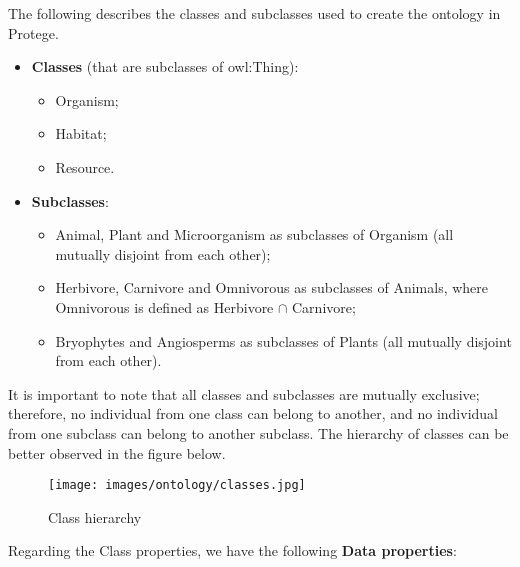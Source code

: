 

The following describes the classes and subclasses used to create the ontology in Protege.
\\

\begin{itemize}
    \item \textbf{Classes} (that are subclasses of owl:Thing):
    \begin{itemize}
        \item Organism;

        \item Habitat;

        \item Resource.
        \\
    \end{itemize}

    \item \textbf{Subclasses}:
    \begin{itemize}
        \item Animal, Plant and Microorganism as subclasses of Organism (all mutually disjoint from each other);

        \item Herbivore, Carnivore and Omnivorous as subclasses of Animals, where Omnivorous is defined as Herbivore $\cap$ Carnivore;

        \item Bryophytes and  Angiosperms as subclasses of Plants (all mutually disjoint from each other).
        \\
    \end{itemize} 
\end{itemize}

It is important to note that all classes and subclasses are mutually exclusive; therefore, no individual from one class can belong to another, and no individual from one subclass can belong to another subclass. The hierarchy of classes can be better observed in the figure below.

\begin{figure}[H]
    \centering
    \texttt{[image: images/ontology/classes.jpg]}
    \caption{Class hierarchy}
    \label{fig:class}
\end{figure}


Regarding the Class properties, we have the following \textbf{Data properties}:
\\

